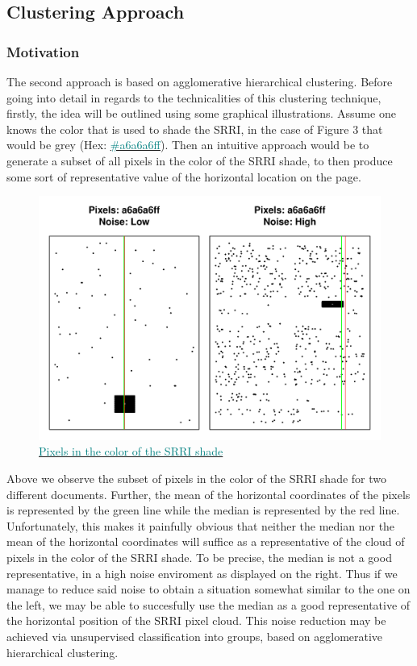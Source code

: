\documentclass[aodsor,preprint]{imsart}
\numberwithin{equation}{section}
\theoremstyle{plain}
\begin{document}
\subsection{Clustering Approach}
\subsubsection{Motivation}
The second approach is based on agglomerative hierarchical clustering. Before going into detail in regards to the technicalities of this clustering technique, firstly, the idea will be outlined using some graphical illustrations. Assume one knows the color that is used to shade the SRRI, in the case of Figure 3 that would be grey (Hex: \href{https://www.color-hex.com/color/a6a6a6}{\textcolor{teal}{\#a6a6a6ff}}). Then an intuitive approach would be to generate a subset of all pixels in the color of the SRRI shade, to then produce some sort of representative value of the horizontal location on the page.

\begin{figure}[H]
	\includegraphics[width = 12cm]{highnoiselownoise.pdf}
	\caption{\href{https://github.com/Base-R-Best-R/KID/blob/main/Code/Tests/Shade_ext.pdf}{\textcolor{teal}{Pixels in the color of the SRRI shade}}}
\end{figure}

Above we observe the subset of pixels in the color of the SRRI shade for two different documents. Further, the mean of the horizontal coordinates of the pixels is represented by the green line while the median is represented by the red line. Unfortunately, this makes it painfully obvious that neither the median nor the mean of the horizontal coordinates will suffice as a representative of the cloud of pixels in the color of the SRRI shade. To be precise, the median is not a good representative, in a high noise enviroment as displayed on the right. Thus if we manage to reduce said noise to obtain a situation somewhat similar to the one on the left, we may be able to succesfully use the median as a good representative of the horizontal position of the SRRI pixel cloud. This noise reduction may be achieved via unsupervised classification into groups, based on agglomerative hierarchical clustering.
\newpage
\end{document}
